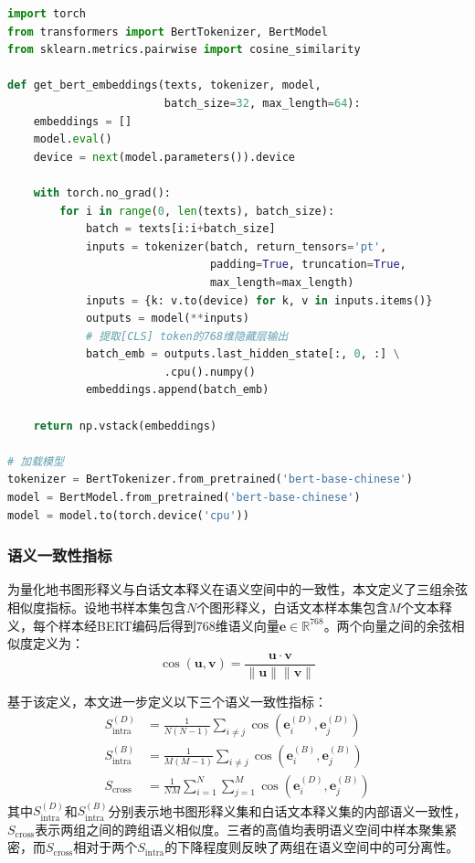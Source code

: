 \documentclass[a4paper,12pt]{article}
\begin{document}
\begin{lstlisting}[language=Python, caption=BERT语义嵌入提取, label=code:bert]
import torch
from transformers import BertTokenizer, BertModel
from sklearn.metrics.pairwise import cosine_similarity

def get_bert_embeddings(texts, tokenizer, model, 
                        batch_size=32, max_length=64):
    embeddings = []
    model.eval()
    device = next(model.parameters()).device
    
    with torch.no_grad():
        for i in range(0, len(texts), batch_size):
            batch = texts[i:i+batch_size]
            inputs = tokenizer(batch, return_tensors='pt', 
                               padding=True, truncation=True,
                               max_length=max_length)
            inputs = {k: v.to(device) for k, v in inputs.items()}
            outputs = model(**inputs)
            # 提取[CLS] token的768维隐藏层输出
            batch_emb = outputs.last_hidden_state[:, 0, :] \
                        .cpu().numpy()
            embeddings.append(batch_emb)
    
    return np.vstack(embeddings)

# 加载模型
tokenizer = BertTokenizer.from_pretrained('bert-base-chinese')
model = BertModel.from_pretrained('bert-base-chinese')
model = model.to(torch.device('cpu'))
\end{lstlisting}

\subsubsection{语义一致性指标}

为量化地书图形释义与白话文本释义在语义空间中的一致性，本文定义了三组余弦相似度指标。设地书样本集包含$N$个图形释义，白话文本样本集包含$M$个文本释义，每个样本经BERT编码后得到768维语义向量$\mathbf{e} \in \mathbb{R}^{768}$。两个向量之间的余弦相似度定义为：
\begin{equation}
    \cos(\mathbf{u}, \mathbf{v}) = \frac{\mathbf{u} \cdot \mathbf{v}}{\|\mathbf{u}\| \|\mathbf{v}\|}
\end{equation}

基于该定义，本文进一步定义以下三个语义一致性指标：
\begin{align}
    S_{\text{intra}}^{(D)} &= \frac{1}{N(N-1)} \sum_{i \neq j} \cos(\mathbf{e}_i^{(D)}, \mathbf{e}_j^{(D)}) \\
    S_{\text{intra}}^{(B)} &= \frac{1}{M(M-1)} \sum_{i \neq j} \cos(\mathbf{e}_i^{(B)}, \mathbf{e}_j^{(B)}) \\
    S_{\text{cross}} &= \frac{1}{NM} \sum_{i=1}^{N} \sum_{j=1}^{M} \cos(\mathbf{e}_i^{(D)}, \mathbf{e}_j^{(B)})
\end{align}
其中$S_{\text{intra}}^{(D)}$和$S_{\text{intra}}^{(B)}$分别表示地书图形释义集和白话文本释义集的内部语义一致性，$S_{\text{cross}}$表示两组之间的跨组语义相似度。三者的高值均表明语义空间中样本聚集紧密，而$S_{\text{cross}}$相对于两个$S_{\text{intra}}$的下降程度则反映了两组在语义空间中的可分离性。
\end{document}
